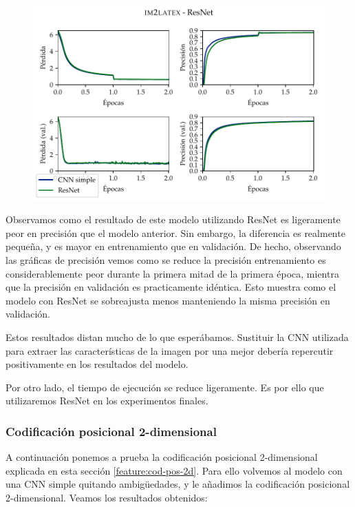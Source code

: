 \documentclass[a4paper, 20pt, dvipsnames]{article}
\begin{document}
\begin{figure}[H]
	\centering
	\includegraphics{fig/im2latex-3b.pdf}
\end{figure}

Observamos como el resultado de este modelo utilizando ResNet es ligeramente
peor en precisión que el modelo anterior. Sin embargo, la diferencia es
realmente pequeña, y es mayor en entrenamiento que en validación. De hecho,
observando las gráficas de precisión vemos como se reduce la precisión
entrenamiento es considerablemente peor durante la primera mitad de la primera
época, mientra que la precisión en validación es practicamente idéntica. Esto
muestra como el modelo con ResNet se sobreajusta menos manteniendo la misma
precisión en validación.

Estos resultados distan mucho de lo que esperábamos. Sustituir la CNN utilizada
para extraer las características de la imagen por una mejor debería repercutir
positivamente en los resultados del modelo.

Por otro lado, el tiempo de ejecución se reduce ligeramente. Es por ello que
utilizaremos ResNet en los experimentos finales.


\subsubsection{Codificación posicional 2-dimensional}
\label{exp:3c}

A continuación ponemos a prueba la codificación posicional 2-dimensional
explicada en esta sección \ref{feature:cod-pos-2d}. Para ello volvemos al modelo
con una CNN simple quitando ambigüedades, y le añadimos la codificación
posicional 2-dimensional. Veamos los resultados obtenidos:
\end{document}
